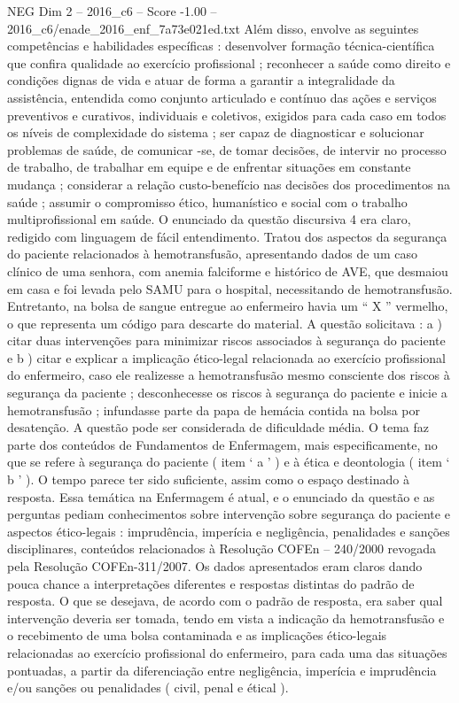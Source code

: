 \begin{textsample}{NEG Dim 2 – 2016\_c6 – Score -1.00 – 2016\_c6/enade\_2016\_enf\_7a73e021ed.txt}
Além disso, envolve as seguintes competências e habilidades específicas : desenvolver formação técnica-científica que confira qualidade ao exercício profissional ; reconhecer a saúde como direito e condições dignas de vida e atuar de forma a garantir a integralidade da assistência, entendida como conjunto articulado e contínuo das ações e serviços preventivos e curativos, individuais e coletivos, exigidos para cada caso em todos os níveis de complexidade do sistema ; ser capaz de diagnosticar e solucionar problemas de saúde, de comunicar -se, de tomar decisões, de intervir no processo de trabalho, de trabalhar em equipe e de enfrentar situações em constante mudança ; considerar a relação custo-benefício nas decisões dos procedimentos na saúde ; assumir o compromisso ético, humanístico e social com o trabalho multiprofissional em saúde.
O enunciado da questão discursiva 4 era claro, redigido com linguagem de fácil entendimento.
Tratou dos aspectos da segurança do paciente relacionados à hemotransfusão, apresentando dados de um caso clínico de uma senhora, com anemia falciforme e histórico de AVE, que desmaiou em casa e foi levada pelo SAMU para o hospital, necessitando de hemotransfusão.
Entretanto, na bolsa de sangue entregue ao enfermeiro havia um “ X ” vermelho, o que representa um código para descarte do material.
A questão solicitava : a ) citar duas intervenções para minimizar riscos associados à segurança do paciente e b ) citar e explicar a implicação ético-legal relacionada ao exercício profissional do enfermeiro, caso ele realizesse a hemotransfusão mesmo consciente dos riscos à segurança da paciente ; desconhecesse os riscos à segurança do paciente e inicie a hemotransfusão ; infundasse parte da papa de hemácia contida na bolsa por desatenção.
A questão pode ser considerada de dificuldade média.
O tema faz parte dos conteúdos de Fundamentos de Enfermagem, mais especificamente, no que se refere à segurança do paciente ( item ‘ a ’ ) e à ética e deontologia ( item ‘ b ’ ).
O tempo parece ter sido suficiente, assim como o espaço destinado à resposta.
Essa temática na Enfermagem é atual, e o enunciado da questão e as perguntas pediam conhecimentos sobre intervenção sobre segurança do paciente e aspectos ético-legais : imprudência, imperícia e negligência, penalidades e sanções disciplinares, conteúdos relacionados à Resolução COFEn – 240/2000 revogada pela Resolução COFEn-311/2007.
Os dados apresentados eram claros dando pouca chance a interpretações diferentes e respostas distintas do padrão de resposta.
O que se desejava, de acordo com o padrão de resposta, era saber qual intervenção deveria ser tomada, tendo em vista a indicação da hemotransfusão e o recebimento de uma bolsa contaminada e as implicações ético-legais relacionadas ao exercício profissional do enfermeiro, para cada uma das situações pontuadas, a partir da diferenciação entre negligência, imperícia e imprudência e/ou sanções ou penalidades ( civil, penal e étical ).

\end{textsample}
